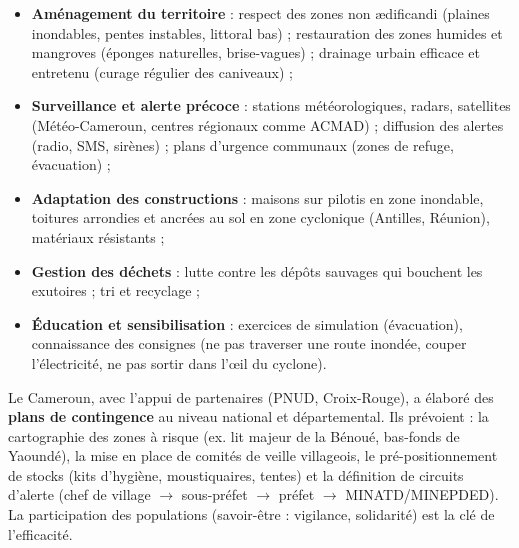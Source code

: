 \documentclass[11pt]{article}
\begin{document}
\begin{propriete}
\begin{itemize}
\item \textbf{Aménagement du territoire} : respect des zones non \ae{}dificandi (plaines inondables, pentes instables, littoral bas) ; restauration des zones humides et mangroves (éponges naturelles, brise-vagues) ; drainage urbain efficace et entretenu (curage régulier des caniveaux) ;
\item \textbf{Surveillance et alerte précoce} : stations météorologiques, radars, satellites (Météo-Cameroun, centres régionaux comme ACMAD) ; diffusion des alertes (radio, SMS, sirènes) ; plans d'urgence communaux (zones de refuge, évacuation) ;
\item \textbf{Adaptation des constructions} : maisons sur pilotis en zone inondable, toitures arrondies et ancrées au sol en zone cyclonique (Antilles, Réunion), matériaux résistants ;
\item \textbf{Gestion des déchets} : lutte contre les dépôts sauvages qui bouchent les exutoires ; tri et recyclage ;
\item \textbf{Éducation et sensibilisation} : exercices de simulation (évacuation), connaissance des consignes (ne pas traverser une route inondée, couper l'électricité, ne pas sortir dans l'œil du cyclone).
\end{itemize}
\end{propriete}

\begin{exemplebox}
Le Cameroun, avec l'appui de partenaires (PNUD, Croix-Rouge), a élaboré des \textbf{plans de contingence} au niveau national et départemental. Ils prévoient : la cartographie des zones à risque (ex. lit majeur de la Bénoué, bas-fonds de Yaoundé), la mise en place de comités de veille villageois, le pré-positionnement de stocks (kits d'hygiène, moustiquaires, tentes) et la définition de circuits d'alerte (chef de village $\rightarrow$ sous-préfet $\rightarrow$ préfet $\rightarrow$ MINATD/MINEPDED). La participation des populations (savoir-être : vigilance, solidarité) est la clé de l'efficacité.
\end{exemplebox}
\end{document}
